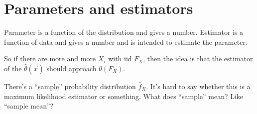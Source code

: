 
\chapter{Parameters and estimators}

Parameter is a function of the distribution and gives a number. Estimator is a
function of data and gives a number and is intended to estimate the parameter.

So if there are more and more $X_i$ with iid $F_X$, then the idea is that the estimator of the $\hat{\theta}(\vec{x})$ should approach $\theta(F_X)$.

There's a ``sample'' probability distribution $\hat{f}_X$. It's hard to say whether this is a maximum likelihood estimator or something. What does ``sample'' mean? Like ``sample mean''?